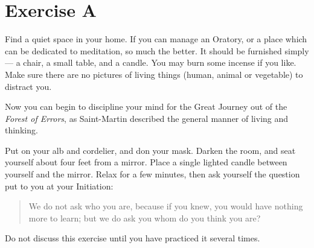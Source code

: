 \section{Exercise A}
Find a quiet space in your home. If you can manage an Oratory, or a place which can be
dedicated to meditation, so much the better. It should be furnished simply --– a chair, a small
table, and a candle. You may burn some incense if you like. Make sure there are no pictures of
living things (human, animal or vegetable) to distract you.

Now you can begin to discipline your mind for the Great Journey out of the \textit{Forest of Errors}, as
Saint-Martin described the general manner of living and thinking.

Put on your alb and cordelier, and don your mask. Darken the room, and seat yourself about four
feet from a mirror. Place a single lighted candle between yourself and the mirror. Relax for a
few minutes, then ask yourself the question put to you at your Initiation:

\begin{quote}
    We do not ask who you are, because if you knew, you would have nothing more to learn; but
we do ask you whom do you think you are?
\end{quote}

Do not discuss this exercise until you have practiced it several times.


